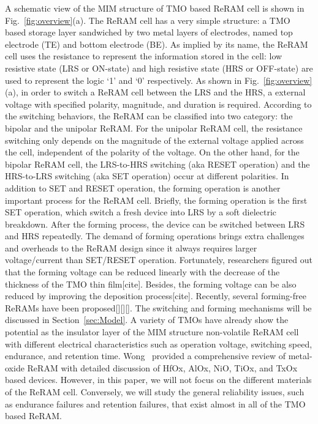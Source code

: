 A schematic view of the MIM structure of TMO based ReRAM cell is shown in Fig.~\ref{fig:overview}(a). The ReRAM cell has a very simple structure: a TMO based storage layer sandwiched by two metal layers of electrodes, named top electrode (TE) and bottom electrode (BE). As implied by its name, the ReRAM cell uses the resistance to represent the information stored in the cell: low resistive state (LRS or ON-state) and high resistive state (HRS or OFF-state) are used to represent the logic `1' and `0' respectively. As shown in Fig.~\ref{fig:overview}(a), in order to switch a ReRAM cell between the LRS and the HRS, a external voltage with specified polarity, magnitude, and duration is required. According to the switching behaviors, the ReRAM can be classified into two category: the bipolar and the unipolar ReRAM. For the unipolar ReRAM cell, the resistance switching only depends on the magnitude of the external voltage applied across the cell, independent of the polarity of the voltage. On the other hand, for the bipolar ReRAM cell, the LRS-to-HRS switching (aka RESET operation) and the HRS-to-LRS switching (aka SET operation) occur at different polarities.  In addition to SET and RESET operation, the forming operation is another important process for the ReRAM cell. Briefly, the forming operation is the first SET operation, which switch a fresh device into LRS by a soft dielectric breakdown. After the forming process, the device can be switched between LRS and HRS repeatedly. The demand of forming operations brings extra challenges and overheads to the ReRAM design since it always requires larger voltage/current than SET/RESET operation. Fortunately, researchers figured out that the forming voltage can be reduced linearly with the decrease of the thickness of the TMO thin film[cite]. Besides, the forming voltage can be also reduced by improving the deposition process[cite]. Recently, several forming-free ReRAMs have been proposed[][][]. The switching and forming mechanisms will be discussed in Section~\ref{sec:Model}. A variety of TMOs have already show the potential as the insulator layer of the MIM structure non-volatile ReRAM cell with different electrical characteristics such as operation voltage, switching speed, endurance, and retention time. Wong~\cite{review_wong} provided a comprehensive review of metal-oxide ReRAM with detailed discussion of HfOx, AlOx, NiO, TiOx, and TxOx based devices. However, in this paper, we will not focus on the different materials of the ReRAM cell. Conversely, we will study the general reliability issues, such as endurance failures and retention failures, that exist almost in all of the TMO based ReRAM.

